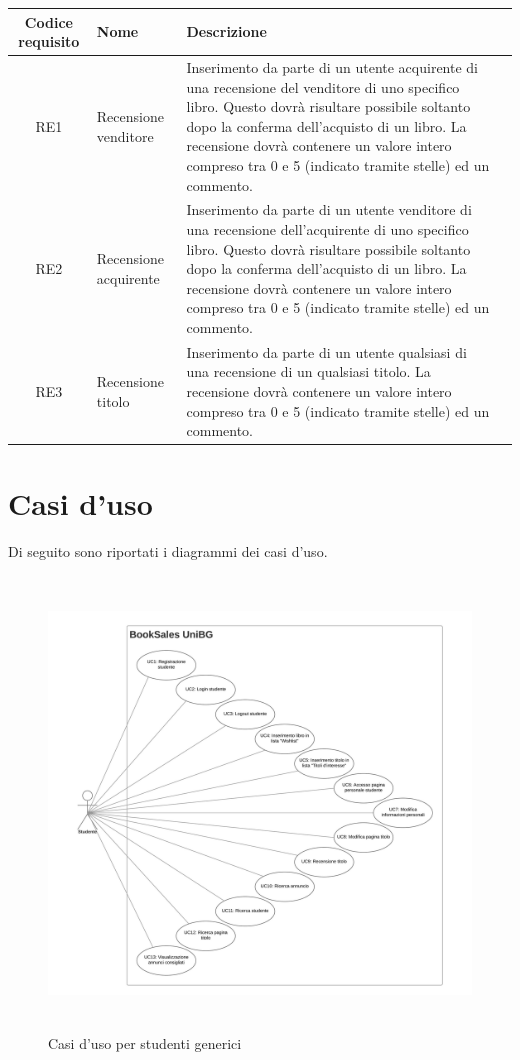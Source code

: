 \documentclass[10pt,a4paper]{article}
\begin{document}
	\begin{tabular}{cp{3cm}p{9cm}p{1cm}}
		Codice requisito&Nome&Descrizione\\ \hline
		RE1&Recensione venditore&Inserimento da parte di un utente acquirente di una recensione del venditore di uno specifico libro. Questo dovrà risultare possibile soltanto dopo la conferma dell'acquisto di un libro. La recensione dovrà contenere un valore intero compreso tra 0 e 5 (indicato tramite stelle) ed un commento.\\ \hline
		RE2&Recensione acquirente&Inserimento da parte di un utente venditore di una recensione dell'acquirente di uno specifico libro. Questo dovrà risultare possibile soltanto dopo la conferma dell'acquisto di un libro. La recensione dovrà contenere un valore intero compreso tra 0 e 5 (indicato tramite stelle) ed un commento.\\ \hline
		RE3&Recensione titolo&Inserimento da parte di un utente qualsiasi di una recensione di un qualsiasi titolo. La recensione dovrà contenere un valore intero compreso tra 0 e 5 (indicato tramite stelle) ed un commento.\\ \hline
	\end{tabular}
	
	\section{Casi d'uso}
	Di seguito sono riportati i diagrammi dei casi d'uso.
	
	\begin{figure}[H]
		\centering
		\includegraphics[height=12cm, width=17cm, keepaspectratio]{g_uc}
		\caption{Casi d'uso per studenti generici}
	\end{figure}
\end{document}
